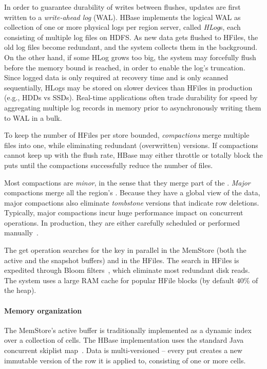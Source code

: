In order to guarantee durability of writes between flushes, updates are first written to 
a \emph{write-ahead log} (WAL). HBase implements the logical WAL as collection of one or more physical 
logs per region server, called \emph{HLog}s, each consisting of multiple log files on HDFS. 
As new data gets flushed to HFiles, the old log files become redundant, and the system collects 
them in the background. On the other hand, if some HLog grows too big, the system may forcefully
flush before the memory bound is reached, in order to enable the log's truncation. 
Since logged data is only required at recovery time and is only scanned sequentially, HLogs
may be stored on slower devices than HFiles in production (e.g., HDDs vs SSDs). 
Real-time applications often trade durability for speed by aggregating multiple log records 
in memory prior to asynchronously writing them to WAL in a bulk. 

To keep the number of HFiles per store bounded, \emph{compactions} merge multiple files 
into one, while eliminating redundant (overwritten) versions. If compactions cannot keep up
with the flush rate, HBase may either throttle or totally block the puts until the compactions 
successfully reduce the number of files. 

Most compactions are \emph{minor}, 
in the sense that they merge part of the . \emph{Major} compactions merge all the region's 
. Because they have a global view of the data, major compactions also eliminate 
{\em tombstone} versions that indicate row deletions. Typically, major compactions incur huge 
performance impact on concurrent operations. In production, they are either carefully scheduled 
or performed manually~\cite{hbasetuning}.

The get operation searches for the key in parallel in the MemStore (both the active and the 
snapshot buffers) and in the HFiles. The search in HFiles is expedited through Bloom 
filters~\cite{Chang2008}, which eliminate most redundant disk reads. The system 
uses a large RAM cache for popular HFile blocks (by default $40\%$ of the heap).

\paragraph{Memory organization}
The MemStore's active buffer is traditionally implemented as a dynamic index over a collection of cells.  
The HBase implementation uses the standard Java concurrent skiplist map~\cite{javaskiplist}.
Data is multi-versioned -- every put creates a new immutable version of the row it is applied to, 
consisting of one or more cells. 


